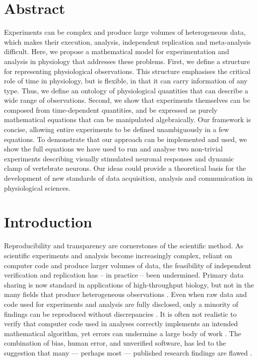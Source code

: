 
\section*{Abstract}

Experiments can be complex and produce large volumes of heterogeneous
data, which makes their execution, analysis, independent replication
and meta-analysis difficult. Here, we propose a mathematical model for
experimentation and analysis in physiology that addresses these
problems. First, we define a structure for representing physiological
observations. This structure emphasises the critical role of time in
physiology, but is flexible, in that it can carry information of any
type. Thus, we define an ontology of physiological quantities that can
describe a wide range of observations. Second, we show that
experiments themselves can be composed from time-dependent quantities,
and be expressed as purely mathematical equations that can be
manipulated algebraically. Our framework is concise, allowing entire
experiments to be defined unambiguously in a few equations. To
demonstrate that our approach can be implemented and used, we show the
full equations we have used to run and analyse two non-trivial
experiments describing visually stimulated neuronal responses and
dynamic clamp of vertebrate neurons. Our ideas could provide a
theoretical basis for the development of new standards of data
acquisition, analysis and communication in physiological sciences.

\pagebreak

\section*{Introduction}

Reproducibility and transparency are cornerstones of the scientific
method. As scientific experiments and analysis become increasingly
complex, reliant on computer code and produce larger volumes of data,
the feasibility of independent verification and replication has -- in
practice -- been undermined. Primary data sharing is now standard in
applications of high-throughput biology, but not in the many fields
that produce heterogeneous observations \citep{Gardner2005,
  Tukey1962}. Even when raw data and code used for experiments and
analysis are fully disclosed, only a minority of findings can be
reproduced without discrepancies \citep{Ioannidis2008,Baggerly2009,
  McCullough2007}. It is often not realistic to verify that computer
code used in analyses correctly implements an intended mathematical
algorithm, yet errors can undermine a large body of work
\citep{Chang2006}. The combination of bias, human error, and
unverified software, has led to the suggestion that many --- perhaps
most --- published research findings are flawed \citep{Ioannidis2005,
  Merali2010}.

